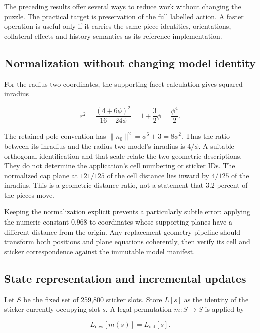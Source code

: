 \documentclass[
  10pt,
  a4paper,
]{article}
\begin{document}
The preceding results offer several ways to reduce work without changing
the puzzle. The practical target is preservation of the full labelled
action. A faster operation is useful only if it carries the same piece
identities, orientations, collateral effects and history semantics as
its reference implementation.

\subsection{Normalization without changing model
identity}\label{normalization-without-changing-model-identity}

For the radius-two coordinates, the supporting-facet calculation gives
squared inradius

\begin{equation}
r^2=\frac{(4+6\phi)^2}{16+24\phi}
=1+\frac32\phi=\frac{\phi^4}{2}.
\end{equation}

The retained pole convention has \(\|n_0\|^2=\phi^6+3=8\phi^2\). Thus
the ratio between its inradius and the radius-two model's inradius is
\(4/\phi\). A suitable orthogonal identification and that scale relate
the two geometric descriptions. They do not determine the application's
cell numbering or sticker IDs. The normalized cap plane at \(121/125\)
of the cell distance lies inward by \(4/125\) of the inradius. This is a
geometric distance ratio, not a statement that 3.2 percent of the pieces
move.

Keeping the normalization explicit prevents a particularly subtle error:
applying the numeric constant 0.968 to coordinates whose supporting
planes have a different distance from the origin. Any replacement
geometry pipeline should transform both positions and plane equations
coherently, then verify its cell and sticker correspondence against the
immutable model manifest.

\subsection{State representation and incremental
updates}\label{state-representation-and-incremental-updates}

Let \(S\) be the fixed set of 259,800 sticker slots. Store \(L[s]\) as
the identity of the sticker currently occupying slot \(s\). A legal
permutation \(m:S\to S\) is applied by

\begin{equation}
L_{\mathrm{new}}[m(s)]=L_{\mathrm{old}}[s].
\end{equation}
\end{document}
